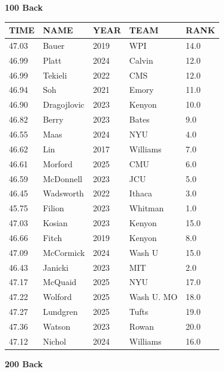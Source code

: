 \begin{table}[H]
\centering
\begin{minipage}[t]{0.48\textwidth}
\centering
\textbf{100 Back}\\[0.1cm]
\begin{tabular}{@{}p{1.8cm}p{2.8cm}p{1.2cm}p{1.4cm}p{0.8cm}@{}}
\hline
    \textbf{TIME} & \textbf{NAME} & \textbf{YEAR} & \textbf{TEAM} & \textbf{RANK} \\
\hline
    47.03 & Bauer & 2019 & WPI & 14.0 \\
    46.99 & Platt & 2024 & Calvin & 12.0 \\
    46.99 & Tekieli & 2022 & CMS & 12.0 \\
    46.94 & Soh & 2021 & Emory & 11.0 \\
    46.90 & Dragojlovic & 2023 & Kenyon & 10.0 \\
    46.82 & Berry & 2023 & Bates & 9.0 \\
    46.55 & Maas & 2024 & NYU & 4.0 \\
    46.62 & Lin & 2017 & Williams & 7.0 \\
    46.61 & Morford & 2025 & CMU & 6.0 \\
    46.59 & McDonnell & 2023 & JCU & 5.0 \\
    46.45 & Wadsworth & 2022 & Ithaca & 3.0 \\
    45.75 & Filion & 2023 & Whitman & 1.0 \\
    47.03 & Kosian & 2023 & Kenyon & 15.0 \\
    46.66 & Fitch & 2019 & Kenyon & 8.0 \\
    47.09 & McCormick & 2024 & Wash U & 15.0 \\
    46.43 & Janicki & 2023 & MIT & 2.0 \\
    47.17 & McQuaid & 2025 & NYU & 17.0 \\
    47.22 & Wolford & 2025 & Wash U. MO & 18.0 \\
    47.27 & Lundgren & 2025 & Tufts & 19.0 \\
    47.36 & Watson & 2023 & Rowan & 20.0 \\
    47.12 & Nichol & 2024 & Williams & 16.0 \\
\hline
\end{tabular}
\end{minipage}\hfill
\begin{minipage}[t]{0.48\textwidth}
\centering
\textbf{200 Back}\\[0.1cm]
\begin{tabular}{@{}p{1.8cm}p{2.8cm}p{1.2cm}p{1.4cm}p{0.8cm}@{}}

\end{tabular}
\end{minipage}
\end{table}
